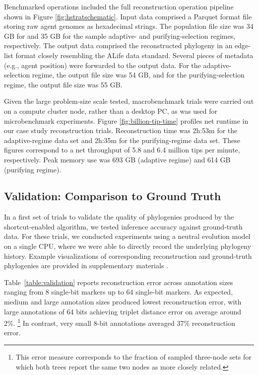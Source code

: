 Benchmarked operations included the full reconstruction operation pipeline shown in Figure \ref{fig:hstratschematic}.
Input data comprised a Parquet format file storing raw agent genomes as hexadecimal strings.
The population file size was 34 GB for and 35 GB for the sample adaptive- and purifying-selection regimes, respectively.
The output data comprised the reconstructed phylogeny in an edge-list format closely resembling the ALife data standard.
Several pieces of metadata (e.g., agent position) were forwarded to the output data.
For the adaptive-selection regime, the output file size was 54 GB, and for the purifying-selection regime, the output file size was 55 GB.

Given the large problem-size scale tested, macrobenchmark trials were carried out on a compute cluster node, rather than a desktop PC, as was used for microbenchmark experiments.
Figure \ref{fig:billion-tip-time} profiles net runtime in our case study reconstruction trials.
Reconstruction time was 2h:53m for the adaptive-regime data set and 2h:35m for the purifying-regime data set.
These figures correspond to a net throughput of 5.8 and 6.4 million tips per minute, respectively.
Peak memory use was 693 GB (adaptive regime) and 614 GB (purifying regime).

\subsection{Validation: Comparison to Ground Truth}

In a first set of trials to validate the quality of phylogenies produced by the shortcut-enabled algorithm, we tested inference accuracy against ground-truth data.
For these trials, we conducted experiments using a neutral evolution model on a single CPU, where we were able to directly record the underlying phylogeny history.
Example visualizations of corresponding reconstruction and ground-truth phylogenies are provided in supplementary materials \citep{supplemental}.



Table~\ref{table:validation} reports reconstruction error across annotation sizes ranging from 8 single-bit markers up to 64 single-bit markers.
As expected, medium and large annotation sizes produced lowest reconstruction error, with large annotations of 64 bits achieving triplet distance error on average around 2\%.%
\footnote{This error measure corresponds to the fraction of sampled three-node sets for which both trees report the same two nodes as more closely related.}
In contrast, very small 8-bit annotations averaged 37\% reconstruction error.

